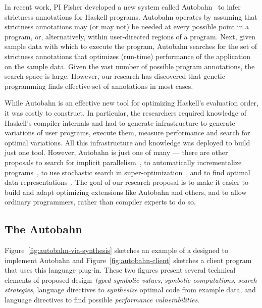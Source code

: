 In recent work, PI Fisher developed a new system called Autobahn~\cite{autobahn}
to infer strictness annotations for Haskell programs.  Autobahn
operates by assuming that strictness annotations may (or may not) be
needed at every possible point in a program, or, alternatively, within
user-directed regions of a program.  Next, given sample data with which to
execute the program, Autobahn searches for the set of strictness annotations
that optimizes (run-time) performance of the application on the sample data.
Given the vast number of possible program annotations, the search space is 
large.  However, our research has discovered that genetic programming finds
effective set of annotations in most cases.

While Autobahn is an effective new tool for optimizing Haskell's evaluation
order, it was costly to construct.  In particular, the researchers
required knowledge of Haskell's compiler internals and had to generate
infrastructure to generate variations of user programs, execute them,
measure performance and search for optimal variations.  All this
infrastructure and knowledge was deployed to build just one tool.  
However, Autobahn is just one of many --- there are other proposals to
search for implicit parallelism~\cite{?}, to automatically incrementalize
programs~\cite{type-directed-incrementalization}, to use stochastic search
in super-optimization~\cite{?,?,?}, and to find optimal data 
representations~\cite{?}.  The goal of our research proposal
is to make it easier to build and adapt optimizing extensions like
Autobahn and others, and to allow ordinary programmers, rather than 
compiler experts to do so.  

\subsection{The Autobahn \rasp}
\label{sec:autobahn}

Figure~\ref{fig:autobahn-via-synthesis} sketches an example of a 
\rasp{} designed to implement Autobahn and Figure~\ref{fig:autobahn-client} sketches a client program that uses this language plug-in.  These two 
figures present
several technical elements of proposed design:  \emph{typed symbolic values}, 
\emph{symbolic computations}, \emph{search strategies}, language directives to
\emph{synthesize} optimal code from example data, and language directives to
find possible \emph{performance vulnerabilities}. 

